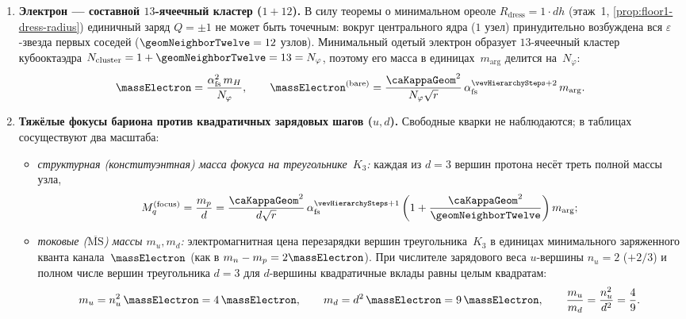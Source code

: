 \begin{enumerate}[leftmargin=*]
\item \textbf{Электрон --- составной $13$-ячеечный кластер ($1+12$).}
  В силу теоремы о минимальном ореоле $R_{\mathrm{dress}}=1\cdot dh$ (этаж~1, \cref{prop:floor1-dress-radius})
  единичный заряд $Q=\pm 1$ не может быть точечным: вокруг центрального ядра ($1$ узел) принудительно возбуждена
  вся $\varepsilon$-звезда первых соседей ($\geomNeighborTwelve=12$ узлов).
  Минимальный одетый электрон образует $13$-ячеечный кластер кубооктаэдра $N_{\mathrm{cluster}}=1+\geomNeighborTwelve=13=N_\varphi$,
  поэтому его масса в единицах~$m_{\arg}$ делится на~$N_\varphi$:
  \[
    \massElectron = \frac{\alpha_{\mathrm{fs}}^2\,m_H}{N_\varphi},\qquad
    \massElectron^{(\mathrm{bare})} = \frac{\caKappaGeom^2}{N_\varphi\sqrt{r}}\,\alpha_{\mathrm{fs}}^{\vevHierarchySteps+2}\,m_{\arg}.
  \]

\item \textbf{Тяжёлые фокусы бариона против квадратичных зарядовых шагов ($u,d$).}
  Свободные кварки не наблюдаются; в таблицах сосуществуют два масштаба:
  \begin{itemize}[noitemsep]
  \item \emph{структурная (конституэнтная) масса фокуса на треугольнике~$K_3$:}
    каждая из $d=3$ вершин протона несёт треть полной массы узла,
    \[
      M_q^{(\mathrm{focus})} = \frac{m_p}{d} = \frac{\caKappaGeom^2}{d\sqrt{r}}\,\alpha_{\mathrm{fs}}^{\vevHierarchySteps+1}\left(1+\frac{\caKappaGeom^2}{\geomNeighborTwelve}\right)m_{\arg};
    \]
  \item \emph{токовые ($\overline{\mathrm{MS}}$) массы $m_u,m_d$:}
    электромагнитная цена перезарядки вершин треугольника~$K_3$ в единицах минимального заряженного кванта канала~$\massElectron$
    (как в $m_n-m_p=2\massElectron$). При числителе зарядового веса $u$-вершины $n_u=2$ ($+2/3$) и полном числе вершин
    треугольника $d=3$ для $d$-вершины квадратичные вклады равны целым квадратам:
    \[
      m_u = n_u^2\,\massElectron = 4\,\massElectron,\qquad
      m_d = d^2\,\massElectron = 9\,\massElectron,\qquad
      \frac{m_u}{m_d} = \frac{n_u^2}{d^2} = \frac{4}{9}.
    \]
  \end{itemize}


\end{enumerate}
